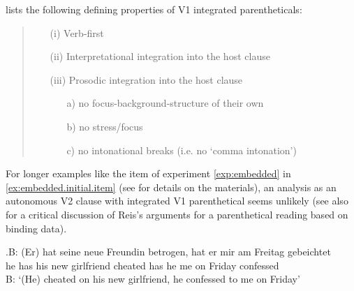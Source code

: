 \citet{reis1996} lists the following defining properties of V1 integrated parentheticals:
\begin{quote}
\begin{enumerate}
\item[(i)] Verb-first
\item[(ii)] Interpretational integration into the host clause
\item[(iii)] Prosodic integration into the host clause 
\begin{enumerate}
\item[a)] no focus-background-structure of their own 
\item[b)] no stress/focus 
\item[c)] no intonational breaks (i.e. no `comma intonation') \citep[48]{reis1996}
\end{enumerate}
\end{enumerate}
\end{quote}

\noindent
For longer examples like the item of experiment \ref*{exp:embedded} in \ref{ex:embedded.initial.item} (see  for details on the materials), an analysis as an autonomous V2 clause with integrated V1 parenthetical seems unlikely (see also \cite[149--151]{pauly2013} for a critical discussion of Reis's arguments for a parenthetical reading based on binding data). 

\exg.\label{ex:embedded.initial.item}B: (Er) hat seine neue Freundin betrogen, hat er mir am Freitag gebeichtet\\
{} he has his new girlfriend cheated has he me on Friday confessed\\
B: `(He) cheated on his new girlfriend, he confessed to me on Friday'

